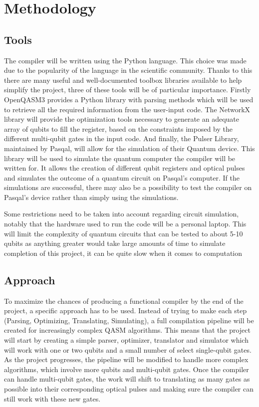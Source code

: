 \section{Methodology}
\label{sec:methods}

\subsection{Tools}
\label{sec:Tools}
The compiler will be written using the Python language. This choice was made due to the popularity of the language in 
the scientific community. Thanks to this there are many useful and well-documented toolbox libraries available to help simplify the project,
three of these tools will be of particular importance.
Firstly OpenQASM3 provides a Python library with parsing methods which will be used to retrieve all the required information from the
user-input code. 
The NetworkX library will provide the optimization tools necessary to generate an adequate array 
of qubits to fill the register, based on the constraints imposed by the different multi-qubit gates in the input code.
And finally, the Pulser Library, maintained by Pasqal, will allow for the simulation of their Quantum device. 
This library will be used to simulate the quantum computer the compiler will be written for. It allows the creation of
different qubit registers and optical pulses and simulates the outcome of a quantum circuit on Pasqal's computer.
If the simulations are successful, there may also be a possibility to test the compiler on Pasqal's device rather than simply using the simulations.

Some restrictions need to be taken into account regarding circuit simulation, notably that the hardware used to run the code will be
 a personal laptop. This will limit the complexity of quantum circuits that can be tested to about 5-10 qubits as anything greater
 would take large amounts of time to simulate %
 completion of this project, it can be quite slow when it comes to computation %
\subsection{Approach}
\label{sec:Approach}
To maximize the chances of producing a functional compiler by the end of the project, a specific approach has to be used. Instead of
 trying to make each step (Parsing, Optimizing, Translating, Simulating), a full compilation pipeline will be created for increasingly complex 
 QASM algorithms. This means that the project will start by creating a simple parser, optimizer, translator and simulator which will work with
 one or two qubits and a small number of select single-qubit gates. As the project progresses, the pipeline will be modified to handle more complex algorithms, 
 which involve more qubits and multi-qubit gates. Once the compiler can handle multi-qubit gates, the work will shift to translating as many gates as possible 
 into their corresponding optical pulses and making sure the compiler can still work with these new gates.
